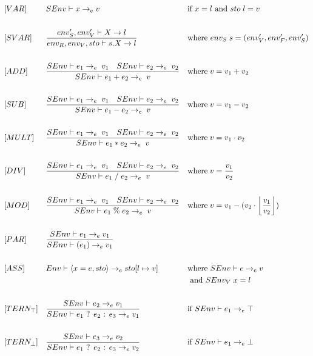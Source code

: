 \begin{align*}
&[VAR] & &SEnv \vdash x \rightarrow_e v & &\text{if } x = l \text{ and } sto\; l = v\\\\
&[SVAR] & &\frac{env_S^\prime, env_V^\prime \vdash X \rightarrow l}{env_R, env_V, sto \vdash s.X \rightarrow l} & &\text{where } env_S\; s = (env_V^\prime, env_F^\prime, env_S^\prime)\\\\
&[ADD] & &\frac{SEnv \vdash e_1 \rightarrow_e\; v_1\quad SEnv \vdash e_2 \rightarrow_e\; v_2}{SEnv \vdash e_1 + e_2 \rightarrow_e\; v} & &\text{where}\; v = v_1 + v_2\\\\
&[SUB] & &\frac{SEnv \vdash e_1 \rightarrow_e\; v_1\quad SEnv \vdash e_2 \rightarrow_e\; v_2}{SEnv \vdash e_1 - e_2 \rightarrow_e\; v} & &\text{where}\; v = v_1 - v_2\\\\
&[MULT] & &\frac{SEnv \vdash e_1 \rightarrow_e\; v_1\quad SEnv \vdash e_2 \rightarrow_e\; v_2}{SEnv \vdash e_1 * e_2 \rightarrow_e\; v} & &\text{where}\; v = v_1 \cdot v_2\\\\
&[DIV] & &\frac{SEnv \vdash e_1 \rightarrow_e\; v_1\quad SEnv \vdash e_2 \rightarrow_e\; v_2}{SEnv \vdash e_1\; /\; e_2 \rightarrow_e\; v} & &\text{where}\; v = \frac{v_1}{v_2}\\\\
&[MOD] & &\frac{SEnv \vdash e_1 \rightarrow_e\; v_1\quad SEnv \vdash e_2 \rightarrow_e\; v_2}{SEnv \vdash e_1\; \%\; e_2 \rightarrow_e\; v} & &\text{where}\; v = v_1 - (v_2 \cdot \floor*{\frac{v_1}{v_2}})\\\\
&[PAR] & &\frac{SEnv \vdash e_1 \rightarrow_e v_1}{SEnv \vdash (e_1) \rightarrow_e v_1}\\\\
&[ASS] & &Env \vdash \langle x = e, sto \rangle \rightarrow_e sto[l \mapsto v] & &\text{where } SEnv \vdash e \rightarrow_e v\\
& & & & &\text{ and } SEnv_V\; x = l\\\\
&[TERN_\top] & &\frac{SEnv \vdash e_2 \rightarrow_e v_1}{SEnv \vdash e_1 \text{ ? } e_2 \text{ : } e_3 \rightarrow_e v_1} & &\text{if } SEnv \vdash e_1 \rightarrow_e \top\\\\
&[TERN_\bot] & &\frac{SEnv \vdash e_3 \rightarrow_e v_2}{SEnv \vdash e_1 \text{ ? } e_2 \text{ : } e_3 \rightarrow_e v_2} & &\text{if } SEnv \vdash e_1 \rightarrow_e \bot\\\\

\end{align*}
